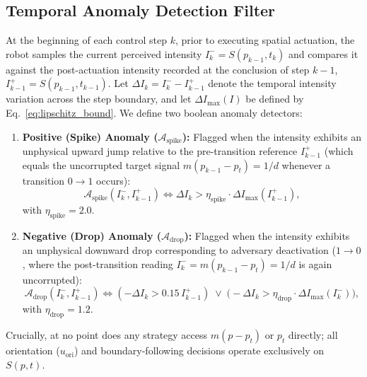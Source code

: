 \documentclass[12pt, a4paper]{article}
\begin{document}
\subsection{Temporal Anomaly Detection Filter}
At the beginning of each control step $k$, prior to executing spatial actuation, the robot samples the current perceived intensity $I_k^- = S(p_{k-1}, t_k)$ and compares it against the post-actuation intensity recorded at the conclusion of step $k-1$, $I_{k-1}^+ = S(p_{k-1}, t_{k-1})$. Let $\Delta I_k = I_k^- - I_{k-1}^+$ denote the temporal intensity variation across the step boundary, and let $\Delta I_{\max}(I)$ be defined by Eq.~\eqref{eq:lipschitz_bound}. We define two boolean anomaly detectors:
\begin{enumerate}
    \item \textbf{Positive (Spike) Anomaly ($\mathcal{A}_{\text{spike}}$):} Flagged when the intensity exhibits an unphysical upward jump relative to the pre-transition reference $I_{k-1}^+$ (which equals the uncorrupted target signal $m(p_{k-1}-p_t) = 1/d$ whenever a transition $0 \to 1$ occurs):
    \begin{equation}
        \mathcal{A}_{\text{spike}}(I_k^-, I_{k-1}^+) \iff \Delta I_k > \eta_{\text{spike}} \cdot \Delta I_{\max}(I_{k-1}^+),
        \label{eq:spike_detector}
    \end{equation}
    with $\eta_{\text{spike}} = 2.0$.
    \item \textbf{Negative (Drop) Anomaly ($\mathcal{A}_{\text{drop}}$):} Flagged when the intensity exhibits an unphysical downward drop corresponding to adversary deactivation ($1 \to 0$, where the post-transition reading $I_k^- = m(p_{k-1}-p_t) = 1/d$ is again uncorrupted):
    \begin{equation}
        \mathcal{A}_{\text{drop}}(I_k^-, I_{k-1}^+) \iff (-\Delta I_k > 0.15\, I_{k-1}^+) \;\lor\; \bigl(-\Delta I_k > \eta_{\text{drop}} \cdot \Delta I_{\max}(I_k^-)\bigr),
        \label{eq:drop_detector}
    \end{equation}
    with $\eta_{\text{drop}} = 1.2$.
\end{enumerate}

Crucially, at no point does any strategy access $m(p - p_t)$ or $p_t$ directly; all orientation ($u_{\text{ori}}$) and boundary-following decisions operate exclusively on $S(p, t)$.
\end{document}
